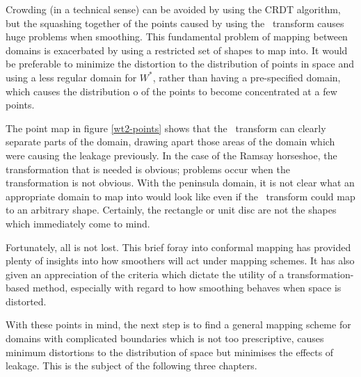 Crowding (in a technical sense) can be avoided by using the CRDT algorithm, but the squashing together of the points caused by using the \sch\ transform causes huge problems when smoothing. This fundamental problem of mapping between domains is exacerbated by using a restricted set of shapes to map into. It would be preferable to minimize the distortion to the distribution of points in space and using a less regular domain for $W^*$, rather than having a pre-specified domain, which causes the distribution o of the points to become concentrated at a few points.

The point map in figure \ref{wt2-points} shows that the \sch\ transform can clearly separate parts of the domain, drawing apart those areas of the domain which were causing the leakage previously. In the case of the Ramsay horseshoe, the transformation that is needed is obvious; problems occur when the transformation is not obvious. With the peninsula domain, it is not clear what an appropriate domain to map into would look like even if the \sch\ transform could map to an arbitrary shape. Certainly, the rectangle or unit disc are not the shapes which immediately come to mind.

Fortunately, all is not lost. This brief foray into conformal mapping has provided plenty of insights into how smoothers will act under mapping schemes. It has also given an appreciation of the criteria which dictate the utility of a transformation-based method, especially with regard to how smoothing behaves when space is distorted.

With these points in mind, the next step is to find a general mapping scheme for domains with complicated boundaries which is not too prescriptive, causes minimum distortions to the distribution of space but minimises the effects of leakage. This is the subject of the following three chapters.



